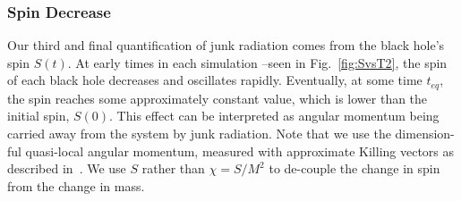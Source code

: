 \documentclass[aps,prd,amsmath,floatfix,twocolumn,superscriptaddress,nofootinbib,showpacs]{revtex4-1}
\theoremstyle{plain}
\theoremstyle{definition}
\newcommand{\note}[1]{\textcolor{Red}{[#1]}}
\begin{document}
\subsubsection{Spin Decrease}

Our third and final quantification of junk radiation comes from the
black hole's spin $S(t)$. At early times in each simulation --seen in Fig.~\ref{fig:SvsT2}, the spin
of each black hole decreases and oscillates rapidly. Eventually, at
some time $t_{eq}$, the spin reaches some approximately constant
value, which is lower than the initial spin, $S(0)$. This effect can
be interpreted as angular momentum being carried away from the system
by junk radiation. Note that we use the dimension-ful quasi-local
angular momentum, measured with approximate Killing vectors as
described in~\cite{Lovelace2008}. We use $S$ rather than $\chi=S/M^2$
to de-couple the change in spin from the change in mass.

\end{document}
